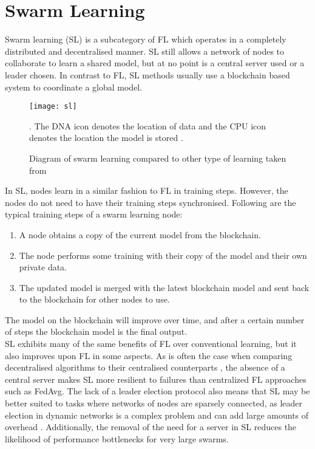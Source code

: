 \section{Swarm Learning}
Swarm learning (SL) \cite{swarm_learning} is a subcategory of FL which operates in a completely distributed and decentralised manner. SL still allows a network of nodes to collaborate to learn a shared model, but at no point is a central server used or a leader chosen. In contrast to FL, SL methods usually use a blockchain based system to coordinate a global model.

\begin{figure}[h]
	\texttt{[image: sl]}
	\caption{Diagram of swarm learning compared to other type of learning taken from \cite{swarm_learning}}. The DNA icon denotes the location of data and the CPU icon denotes the location the model is stored
	\label{fig_learning}.
\end{figure}


In SL, nodes learn in a similar fashion to FL in training steps. However, the nodes do not need to have their training steps synchronised. Following are the typical training steps of a swarm learning node:
\begin{enumerate}
	\item A node obtains a copy of the current model from the blockchain.
	\item The node performs some training with their copy of the model and their own private data.
	\item The updated model is merged with the latest blockchain model and sent back to the blockchain for other nodes to use.
\end{enumerate}
The model on the blockchain will improve over time, and after a certain number of steps the blockchain model is the final output. \\

SL exhibits many of the same benefits of FL over conventional learning, but it also improves upon FL in some aspects. As is often the case when comparing decentralised algorithms to their centralised counterparts \cite{swarm_resil}, the absence of a central server makes SL more resilient to failures than centralized FL approaches such as FedAvg. The lack of a leader election protocol also means that SL may be better suited to tasks where networks of nodes are sparsely connected, as leader election in dynamic networks is a complex problem and can add large amounts of overhead \cite{leaderelection}. Additionally, the removal of the need for a server in SL reduces the likelihood of performance bottlenecks for very large swarms.

